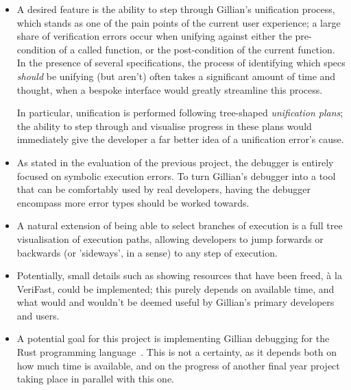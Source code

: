 \begin{itemize}

  \item A desired feature is the ability to step through Gillian's unification
        process, which stands as one of the pain points of the current user
        experience; a large share of verification errors occur when unifying
        against either the pre-condition of a called function, or the
        post-condition of the current function. In the presence of several
        specifications, the process of identifying which specs \textit{should}
        be unifying (but aren't) often takes a significant amount of time and
        thought, when a bespoke interface would greatly streamline this process.

        In particular, unification is performed following tree-shaped
        \textit{unification plans}; the ability to step through and visualise
        progress in these plans would immediately give the developer a far
        better idea of a unification error's cause.

  \item As stated in the evaluation of the previous project, the debugger is
        entirely focused on symbolic execution errors. To turn Gillian's
        debugger into a tool that can be comfortably used by real developers,
        having the debugger encompass more error types should be worked towards.

  \item A natural extension of being able to select branches of execution is a
        full tree visualisation of execution paths, allowing developers to jump
        forwards or backwards (or 'sideways', in a sense) to any step of
        execution.

  \item Potentially, small details such as showing resources that have been
        freed, à la VeriFast, could be implemented; this purely depends on
        available time, and what would and wouldn't be deemed useful by
        Gillian's primary developers and users.

  \item A potential goal for this project is implementing Gillian debugging for
        the Rust programming language~\cite{rust}. This is not a certainty, as
        it depends both on how much time is available, and on the progress of
        another final year project taking place in parallel with this one.

\end{itemize}

